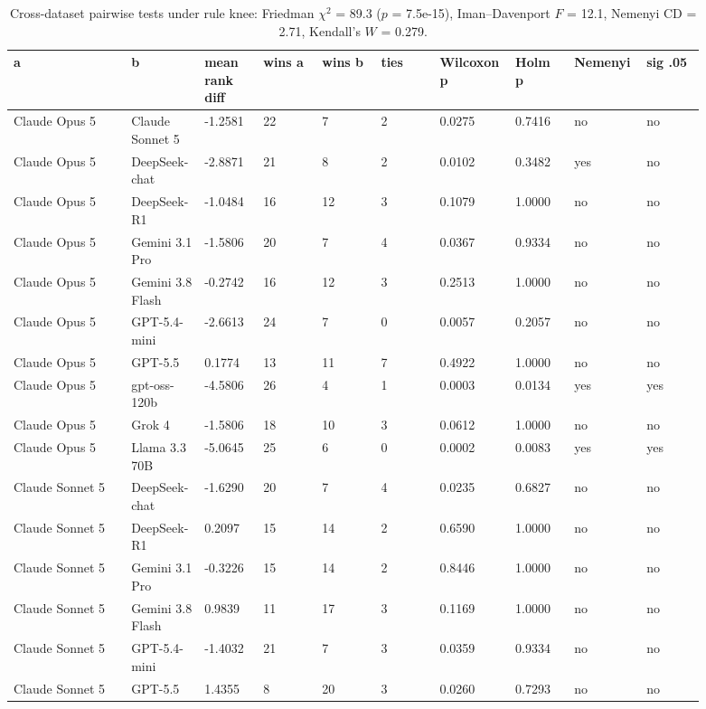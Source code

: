 \begin{landscape}
\tiny
\setlength{\tabcolsep}{3pt}
\begin{longtable}{p{0.162\linewidth}p{0.081\linewidth}p{0.081\linewidth}p{0.081\linewidth}p{0.081\linewidth}p{0.081\linewidth}p{0.081\linewidth}p{0.081\linewidth}p{0.081\linewidth}p{0.081\linewidth}}
\caption{Cross-dataset pairwise tests under rule knee: Friedman $\chi^2$ = 89.3 ($p$ = 7.5e-15), Iman--Davenport $F$ = 12.1, Nemenyi CD = 2.71, Kendall's $W$ = 0.279.}\label{tab:pairwise_pareto_knee}\\
\toprule
a & b & mean rank diff & wins a & wins b & ties & Wilcoxon p & Holm p & Nemenyi & sig .05 \\
\midrule
Claude Opus 5 & Claude Sonnet 5 & -1.2581 & 22 & 7 & 2 & 0.0275 & 0.7416 & no & no \\
Claude Opus 5 & DeepSeek-chat & -2.8871 & 21 & 8 & 2 & 0.0102 & 0.3482 & yes & no \\
Claude Opus 5 & DeepSeek-R1 & -1.0484 & 16 & 12 & 3 & 0.1079 & 1.0000 & no & no \\
Claude Opus 5 & Gemini 3.1 Pro & -1.5806 & 20 & 7 & 4 & 0.0367 & 0.9334 & no & no \\
Claude Opus 5 & Gemini 3.8 Flash & -0.2742 & 16 & 12 & 3 & 0.2513 & 1.0000 & no & no \\
Claude Opus 5 & GPT-5.4-mini & -2.6613 & 24 & 7 & 0 & 0.0057 & 0.2057 & no & no \\
Claude Opus 5 & GPT-5.5 & 0.1774 & 13 & 11 & 7 & 0.4922 & 1.0000 & no & no \\
Claude Opus 5 & gpt-oss-120b & -4.5806 & 26 & 4 & 1 & 0.0003 & 0.0134 & yes & yes \\
Claude Opus 5 & Grok 4 & -1.5806 & 18 & 10 & 3 & 0.0612 & 1.0000 & no & no \\
Claude Opus 5 & Llama 3.3 70B & -5.0645 & 25 & 6 & 0 & 0.0002 & 0.0083 & yes & yes \\
Claude Sonnet 5 & DeepSeek-chat & -1.6290 & 20 & 7 & 4 & 0.0235 & 0.6827 & no & no \\
Claude Sonnet 5 & DeepSeek-R1 & 0.2097 & 15 & 14 & 2 & 0.6590 & 1.0000 & no & no \\
Claude Sonnet 5 & Gemini 3.1 Pro & -0.3226 & 15 & 14 & 2 & 0.8446 & 1.0000 & no & no \\
Claude Sonnet 5 & Gemini 3.8 Flash & 0.9839 & 11 & 17 & 3 & 0.1169 & 1.0000 & no & no \\
Claude Sonnet 5 & GPT-5.4-mini & -1.4032 & 21 & 7 & 3 & 0.0359 & 0.9334 & no & no \\
Claude Sonnet 5 & GPT-5.5 & 1.4355 & 8 & 20 & 3 & 0.0260 & 0.7293 & no & no \\

\end{longtable}
\end{landscape}
